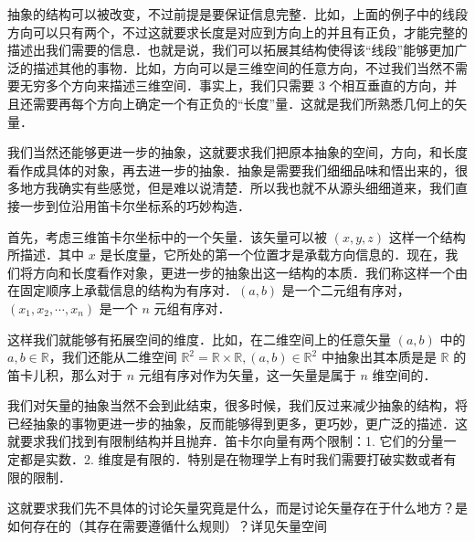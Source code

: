 抽象的结构可以被改变，不过前提是要保证信息完整．比如，上面的例子中的线段方向可以只有两个，不过这就要求长度是对应到方向上的并且有正负，才能完整的描述出我们需要的信息．也就是说，我们可以拓展其结构使得该“线段”能够更加广泛的描述其他的事物．比如，方向可以是三维空间的任意方向，不过我们当然不需要无穷多个方向来描述三维空间．事实上，我们只需要 $3$ 个相互垂直的方向，并且还需要再每个方向上确定一个有正负的“长度”量．这就是我们所熟悉几何上的矢量．

我们当然还能够更进一步的抽象，这就要求我们把原本抽象的空间，方向，和长度看作成具体的对象，再去进一步的抽象．抽象是需要我们细细品味和悟出来的，很多地方我确实有些感觉，但是难以说清楚．所以我也就不从源头细细道来，我们直接一步到位沿用笛卡尔坐标系的巧妙构造．

首先，考虑三维笛卡尔坐标中的一个矢量．该矢量可以被 $(x,y,z)$ 这样一个结构所描述．其中 $x$ 是长度量，它所处的第一个位置才是承载方向信息的．现在，我们将方向和长度看作对象，更进一步的抽象出这一结构的本质．我们称这样一个由在固定顺序上承载信息的结构为有序对．$(a,b)$ 是一个二元组有序对，$(x_1,x_2,\cdots,x_n)$ 是一个 $n$ 元组有序对．

这样我们就能够有拓展空间的维度．比如，在二维空间上的任意矢量 $(a,b)$ 中的 $a,b\in \mathbb R$，我们还能从二维空间 $\mathbb R^2 = \mathbb R\times \mathbb R,(a,b)\in \mathbb R^2$ 中抽象出其本质是是 $\mathbb R$ 的笛卡儿积，那么对于 $n$ 元组有序对作为矢量，这一矢量是属于 $n$ 维空间的．

我们对矢量的抽象当然不会到此结束，很多时候，我们反过来减少抽象的结构，将已经抽象的事物更进一步的抽象，反而能够得到更多，更巧妙，更广泛的描述．这就要求我们找到有限制结构并且抛弃．笛卡尔向量有两个限制：1. 它们的分量一定都是实数．2. 维度是有限的．特别是在物理学上有时我们需要打破实数或者有限的限制．

这就要求我们先不具体的讨论矢量究竟是什么，而是讨论矢量存在于什么地方？是如何存在的（其存在需要遵循什么规则）？详见矢量空间
